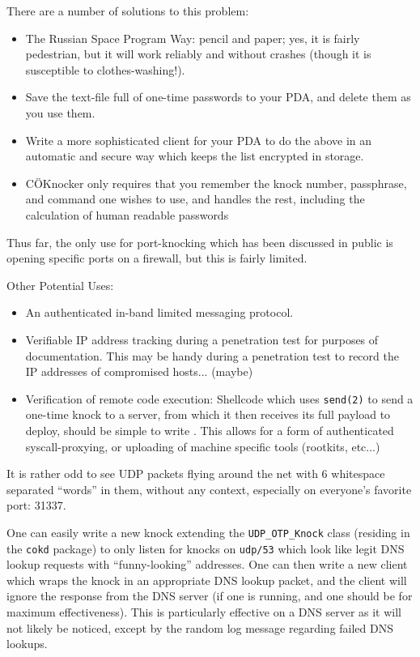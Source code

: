 \documentclass[landscape,twocolumn,headrule]{foils}
\begin{document}

There are a number of solutions to this problem:
\begin{itemize}
\item The Russian Space Program Way: pencil and paper; yes, it is fairly pedestrian, but it will work reliably and without crashes (though it is susceptible to clothes-washing!).
\item Save the text-file full of one-time passwords to your PDA, and delete them as you use them.
\item Write a more sophisticated client for your PDA to do the above in an automatic and secure way which keeps the list encrypted in storage.
\item C\"{O}Knocker only requires that you remember the knock number, passphrase, and command one wishes to use, and handles the rest, including the calculation of human readable passwords
\end{itemize}


Thus far, the only use for port-knocking which has been discussed in public is opening specific ports on a firewall, but this is fairly limited.

Other Potential Uses:
\begin{itemize}
\item An authenticated in-band limited messaging protocol.
\item Verifiable IP address tracking during a penetration test for purposes of documentation.  This may be handy during a penetration test to record the IP addresses of compromised hosts... (maybe)
\item Verification of remote code execution:  Shellcode which uses \texttt{send(2)} to send a one-time knock to a server, from which it then receives its full payload to deploy, should be simple to write .  This allows for a form of authenticated syscall-proxying, or uploading of machine specific tools (rootkits, etc...)
\end{itemize}


It is rather odd to see UDP packets flying around the net with 6 whitespace separated ``words'' in them, without any context, especially on everyone's favorite port: 31337.

One can easily write a new knock extending the \verb;UDP_OTP_Knock; class (residing in the \texttt{cokd} package) to only listen for knocks on \texttt{udp/53} which look like legit DNS lookup requests with ``funny-looking'' addresses.  One can then write a new client which wraps the knock in an appropriate DNS lookup packet, and the client will ignore the response from the DNS server (if one is running, and one should be for maximum effectiveness).  This is particularly effective on a DNS server as it will not likely be noticed, except by the random log message regarding failed DNS lookups.  
\end{document}
